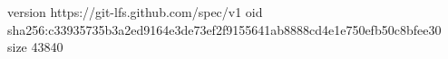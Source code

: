 version https://git-lfs.github.com/spec/v1
oid sha256:c33935735b3a2ed9164e3de73ef2f9155641ab8888cd4e1e750efb50c8bfee30
size 43840
